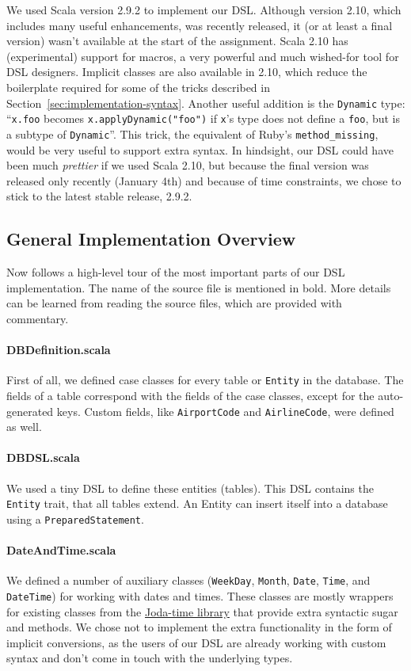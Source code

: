 \documentclass[a4paper]{article}
\newcommand{\cc}[1]{\texttt{#1}}
\renewcommand{\sc}[1]{\lstinline{#1}}
\begin{document}
We used Scala version 2.9.2 to implement our DSL.
Although version 2.10, which includes many useful enhancements, was recently released, it (or at least a final version) wasn't available at the start of the assignment.
Scala 2.10 has (experimental) support for macros, a very powerful and much wished-for tool for DSL designers.
Implicit classes are also available in 2.10, which reduce the boilerplate required for some of the tricks described in Section~\ref{sec:implementation-syntax}.
Another useful addition is the \cc{Dynamic} type: ``\sc{x.foo} becomes \sc{x.applyDynamic("foo")} if \sc{x}'s type does not define a \sc{foo}, but is a subtype of \cc{Dynamic}''.
This trick, the equivalent of Ruby's \cc{method\_missing}, would be very useful to support extra syntax.
In hindsight, our DSL could have been much \emph{prettier} if we used Scala 2.10, but because the final version was released only recently (January 4th) and because of time constraints, we chose to stick to the latest stable release, 2.9.2.


\subsection{General Implementation Overview}
\label{sec:general-implementation-overview}

Now follows a high-level tour of the most important parts of our DSL implementation.
The name of the source file is mentioned in bold.
More details can be learned from reading the source files, which are provided with commentary.

\paragraph{DBDefinition.scala}
First of all, we defined case classes for every table or \cc{Entity} in the database.
The fields of a table correspond with the fields of the case classes, except for the auto-generated keys.
Custom fields, like \cc{Airport\-Code} and \cc{Air\-line\-Code}, were defined as well.

\paragraph{DBDSL.scala}
We used a tiny DSL to define these entities (tables).
This DSL contains the \cc{Entity} trait, that all tables extend.
An Entity can insert itself into a database using a \cc{PreparedStatement}.

\paragraph{DateAndTime.scala}
We defined a number of auxiliary classes (\cc{WeekDay}, \cc{Month}, \cc{Date}, \cc{Time}, and \cc{DateTime}) for working with dates and times.
These classes are mostly wrappers for existing classes from the \href{http://joda-time.sourceforge.net/}{Joda-time library} that provide extra syntactic sugar and methods.
We chose not to implement the extra functionality in the form of implicit conversions, as the users of our DSL are already working with custom syntax and don't come in touch with the underlying types.
\end{document}
